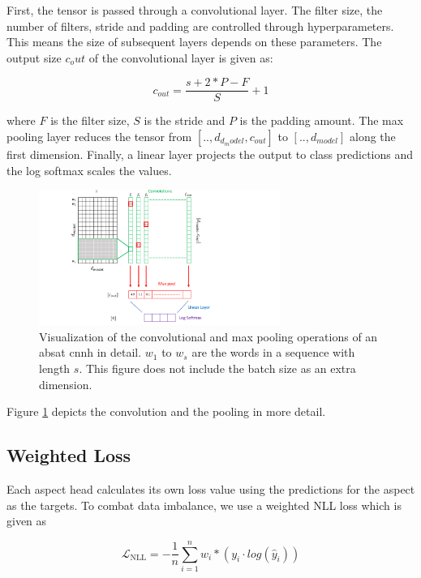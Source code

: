 First, the tensor is passed through a convolutional layer. The filter size, the number of filters, stride and padding are controlled through hyperparameters. This means the size of subsequent layers depends on these parameters. The output size $c_out$ of the convolutional layer is given as:

\begin{equation}
	c_{out} = \frac{s+2*P-F}{S} + 1
\end{equation}

where $F$ is the filter size, $S$ is the stride and $P$ is the padding amount. The max pooling layer reduces the tensor from $[.., d_{d_model}, c_{out}]$ to $[.., d_{model}]$ along the first dimension. Finally, a linear layer projects the output to class predictions and the log softmax scales the values.
\medskip

\begin{figure}[htp]
	\centering
	\includegraphics[width=0.7\textwidth]{figures/04_method/04_ch2}
	\caption{Visualization of the convolutional and max pooling operations of an \gls{absat} \gls{cnnh} in detail. $w_1$ to $w_s$ are the words in a sequence with length $s$. This figure does not include the batch size as an extra dimension.}
	\label{fig:04_ch2}
\end{figure}

Figure \ref{fig:04_ch2} depicts the convolution and the pooling in more detail.

\subsection{Weighted Loss}

Each aspect head calculates its own loss value using the predictions for the aspect as the targets. To combat data imbalance, we use a weighted NLL loss which is given as

\begin{equation}
\mathcal{L}_\text{NLL}=-\frac{1}{n}\sum_{i=1}^{n} w_i * (y_i \cdot log(\hat{y}_i))
\label{eq:04_nll}
\end{equation}

